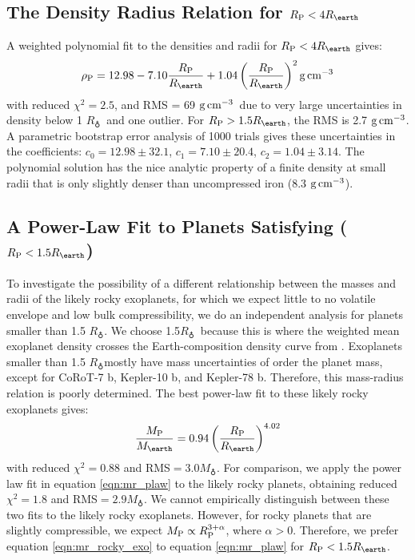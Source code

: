 \documentclass[iop]{emulateapj}
\newcommand{\gcmc}{\ensuremath{\rm g\,cm^{-3}}}
\newcommand{\gcc}{\gcmc}
\newcommand{\rpl}{\ensuremath{R_{\rm P}}}
\newcommand{\mpl}{\ensuremath{M_{\rm P}}}
\newcommand{\rhopl}{\ensuremath{\rho_{\rm P}}}
\newcommand{\rearth}{\ensuremath{R_\earth}}
\newcommand{\mearth}{\ensuremath{M_\earth}}
\newcommand{\rspecial}{4 \rearth}
\begin{document}
\subsection{The Density Radius Relation for $\rpl < \rspecial$}
A weighted polynomial fit to the densities and radii for $\rpl < \rspecial$ gives:
\begin{equation}
\rhopl = 12.98 - 7.10 \frac{\rpl}{\rearth} + 1.04 \left(\frac{\rpl}{\rearth}\right)^{2} \gcc
\label{eqn:dr_poly}
\end{equation}
with reduced $\chi^2=2.5$, and RMS = 69 \gcc\ due to very large uncertainties in density below 1 \rearth\ and one outlier.  For $\rpl > 1.5 \rearth$, the RMS is 2.7 \gcc.  A parametric bootstrap error analysis of 1000 trials gives these uncertainties in the coefficients: $c_0 =12.98 \pm 32.1$, $c_1 = 7.10 \pm 20.4$, $c_2 = 1.04\pm3.14$.   The polynomial solution has the nice analytic property of a finite density at small radii that is only slightly denser than uncompressed iron (8.3 \gcc).

\subsection{A Power-Law Fit to Planets Satisfying ($\rpl < 1.5 \rearth$)}
To investigate the possibility of a different relationship between the masses and radii of the likely rocky exoplanets, for which we expect little to no volatile envelope and low bulk compressibility, we do an independent analysis for planets smaller than 1.5 \rearth.  We choose 1.5\rearth\ because this is where the weighted mean exoplanet density crosses the Earth-composition density curve from \citet[][see Figure \ref{fig:rm_4}]{Seager2007}.  Exoplanets smaller than 1.5 \rearth mostly have mass uncertainties of order the planet mass, except for CoRoT-7 b, Kepler-10 b, and Kepler-78 b.  Therefore, this mass-radius relation is poorly determined.  The best power-law fit to these likely rocky exoplanets gives:
\begin{equation}
\frac{\mpl}{\mearth} = 0.94 \left(\frac{\rpl}{\rearth}\right)^{4.02}
\label{eqn:mr_rocky_exo}
\end{equation}
with reduced $\chi^2 = 0.88$ and RMS$ = 3.0 \mearth$.  For comparison, we apply the power law fit in equation \ref{eqn:mr_plaw} to the likely rocky planets, obtaining reduced $\chi^2 = 1.8$ and RMS$ = 2.9\mearth$.  We cannot empirically distinguish between these two fits to the likely rocky exoplanets.  However, for rocky planets that are slightly compressible, we expect $\mpl \propto \rpl^{3 + \alpha}$, where $\alpha > 0$.  Therefore, we prefer equation \ref{eqn:mr_rocky_exo} to equation \ref{eqn:mr_plaw} for $\rpl < 1.5 \rearth$.
\end{document}
